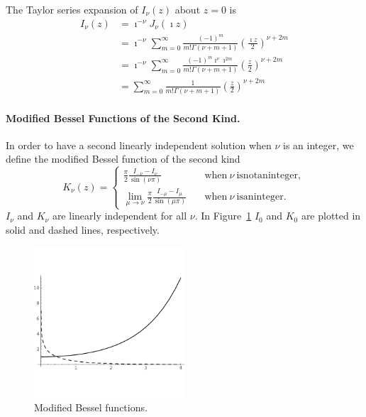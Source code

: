 The Taylor series expansion of $I_\nu(z)$ about $z = 0$ is
\begin{align*}
  I_\nu(z)
  &= \imath^{-\nu} J_\nu(\imath z) 
  \\
  &= \imath^{-\nu} \sum_{m = 0}^\infty \frac{(-1)^m}{m! \Gamma(\nu+m+1)} \left( \frac{\imath z}{2} \right)^{\nu+2m} 
  \\
  &= \imath^{-\nu} \sum_{m = 0}^\infty \frac{(-1)^m \imath^\nu \imath^{2m}}{m! \Gamma(\nu+m+1)} 
  \left( \frac{z}{2} \right)^{\nu+2m} 
  \\
  &= \sum_{m = 0}^\infty \frac{1}{m! \Gamma(\nu + m + 1)} \left( \frac{z}{2} \right)^{\nu + 2 m} 
\end{align*}



\paragraph{Modified Bessel Functions of the Second Kind.}
In order to have a second linearly independent solution when $\nu$ is an 
integer, we define the modified Bessel function of the second kind
\[ 
K_\nu(z) = 
\begin{cases}
  \frac{\pi}{2} \frac{I_{-\nu} - I_\nu}{\sin(\nu \pi)} 
  \quad &\mathrm{when}\ \nu\ \mathrm{is not an integer},
  \\
  \lim_{\mu \to \nu} \frac{\pi}{2} \frac{I_{-\mu} - I_\mu}{\sin(\mu \pi)} 
  \quad &\mathrm{when}\ \nu\ \mathrm{is an integer}.
\end{cases}
\]
$I_\nu$ and $K_\nu$ are linearly independent for all $\nu$.
In Figure~\ref{besselik} $I_0$ and $K_0$ are plotted in solid and dashed lines,
respectively.  


\begin{figure}[h!]
  \begin{center}
    \includegraphics[width=0.5\textwidth]{ode/bessel/besselik}
  \end{center}
  \caption{Modified Bessel functions.}
  \label{besselik}
\end{figure}








